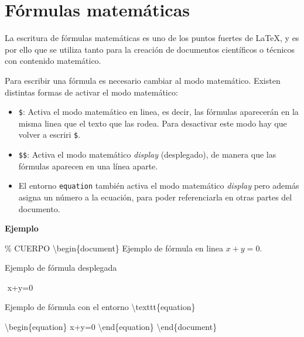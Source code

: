 \documentclass[
  letterpaper,
  DIV=11,
  numbers=noendperiod]{scrreport}
\newenvironment{Shaded}{\begin{snugshade}}{\end{snugshade}}
\newcommand{\CommentTok}[1]{\textcolor[rgb]{0.37,0.37,0.37}{#1}}
\newcommand{\ExtensionTok}[1]{\textcolor[rgb]{0.00,0.23,0.31}{#1}}
\newcommand{\FunctionTok}[1]{\textcolor[rgb]{0.28,0.35,0.67}{#1}}
\newcommand{\KeywordTok}[1]{\textcolor[rgb]{0.00,0.23,0.31}{#1}}
\newcommand{\NormalTok}[1]{\textcolor[rgb]{0.00,0.23,0.31}{#1}}
\newcommand{\SpecialStringTok}[1]{\textcolor[rgb]{0.13,0.47,0.30}{#1}}
\begin{document}

\hypertarget{fuxf3rmulas-matemuxe1ticas}{%
\chapter{Fórmulas matemáticas}\label{fuxf3rmulas-matemuxe1ticas}}

La escritura de fórmulas matemáticas es uno de los puntos fuertes de
\LaTeX, y es por ello que se utiliza tanto para la creación de
documentos científicos o técnicos con contenido matemático.

Para escribir una fórmula es necesario cambiar al modo matemático.
Existen distintas formas de activar el modo matemático:

\begin{itemize}
\item
  \texttt{\$}: Activa el modo matemático en linea, es decir, las
  fórmulas aparecerán en la misma linea que el texto que las rodea. Para
  desactivar este modo hay que volver a escriri \texttt{\$}.
\item
  \texttt{\$\$}: Activa el modo matemático \emph{display} (desplegado),
  de manera que las fórmulas aparecen en una línea aparte.
\item
  El entorno \texttt{equation} también activa el modo matemático
  \emph{display} pero además asigna un número a la ecuación, para poder
  referenciarla en otras partes del documento.
\end{itemize}

\textbf{Ejemplo}

\begin{Shaded}
\begin{Highlighting}[]
\CommentTok{\% CUERPO}
\KeywordTok{\textbackslash{}begin}\NormalTok{\{}\ExtensionTok{document}\NormalTok{\}}
\NormalTok{Ejemplo de fórmula en linea }\SpecialStringTok{$ x+y=0 $}\NormalTok{.}

\NormalTok{Ejemplo de fórmula desplegada}

\SpecialStringTok{$$ }
\SpecialStringTok{x+y=0}
\SpecialStringTok{$$}



\NormalTok{Ejemplo de fórmula con el entorno }\FunctionTok{\textbackslash{}texttt}\NormalTok{\{equation\}}

\KeywordTok{\textbackslash{}begin}\NormalTok{\{}\ExtensionTok{equation}\NormalTok{\}}
\SpecialStringTok{x+y=0}
\KeywordTok{\textbackslash{}end}\NormalTok{\{}\ExtensionTok{equation}\NormalTok{\}}
\KeywordTok{\textbackslash{}end}\NormalTok{\{}\ExtensionTok{document}\NormalTok{\}}
\end{Highlighting}
\end{Shaded}
\end{document}
